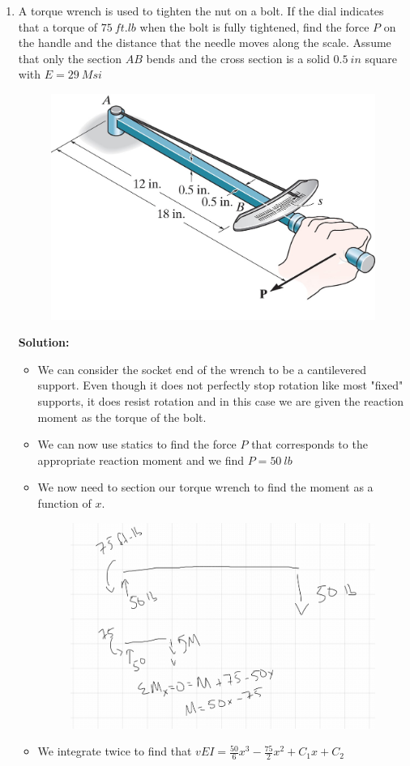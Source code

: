 \documentclass[12pt, oneside]{article}
\let\US\SI
\begin{document}
\begin{enumerate}
	\item %
		A torque wrench is used to tighten the nut on a bolt.
		If the dial indicates that a torque of $ 	\US{75}{ft.lb}  $ when the bolt is fully tightened, find the force $P$ on the handle and the distance that the needle moves along the scale.
		Assume that only the section $AB$ bends and the cross section is a solid $ 	\US{0.5 }{in}  $ square with $E = 	\US{29 }{Msi} $
		\begin{figure}[H]
			\centering
			\includegraphics[width=0.6\linewidth]{12-15}
		\end{figure}
			\textbf{Solution:}
			\begin{itemize}
				\item We can consider the socket end of the wrench to be a cantilevered support. Even though it does not perfectly stop rotation like most "fixed" supports, it does resist rotation and in this case we are given the reaction moment as the torque of the bolt.
				\item We can now use statics to find the force $P$ that corresponds to the appropriate reaction moment and we find $P = 	\US{50}{lb} $
				\item We now need to section our torque wrench to find the moment as a function of $x$.
					\begin{figure}[H]
						\centering
						\includegraphics[width=0.6\linewidth]{12-15a}
					\end{figure}
				\item We integrate twice to find that $v EI = \frac{50}{6}x^3 - \frac{75}{2}x^2 + C_1 x + C_2$

\end{itemize}
\end{enumerate}
\end{document}
